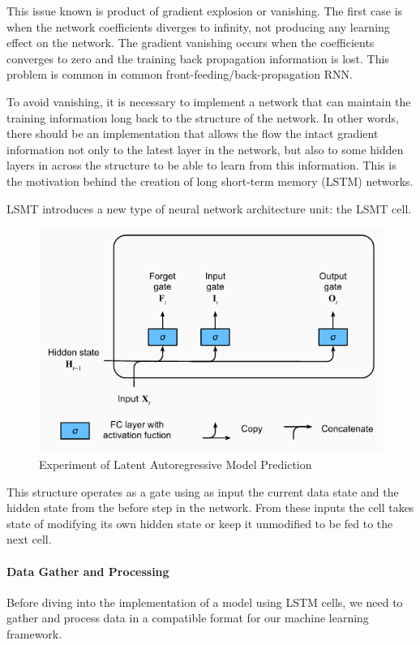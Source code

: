 This issue known is product of gradient explosion or vanishing. The first case is when
the network coefficients diverges to infinity, not producing any learning effect on the
network. The gradient vanishing occurs when the coefficients converges to zero and
the training back propagation information is lost. This problem is common in common
front-feeding/back-propagation RNN.

To avoid vanishing, it is necessary to implement a network that can maintain the
training information long back to the structure of the network. In other words, there
should be an implementation that allows the flow the intact gradient information not
only to the latest layer in the network, but also to some hidden layers in across the
structure to be able to learn from this information. This is the motivation behind the
creation of long short-term memory (LSTM) networks.

LSMT introduces a new type of neural network architecture unit: the LSMT cell.

\begin{figure}[h!]
  \includegraphics[width=\linewidth]{image/fig_JDF14.png}
  \caption{Experiment of Latent Autoregressive Model Prediction}
\end{figure}


This structure operates as a gate using as input the current data state and the hidden
state from the before step in the network. From these inputs the cell takes state of
modifying its own hidden state or keep it unmodified to be fed to the next cell.

\paragraph{Data Gather and Processing} Before diving into the implementation of a model
using LSTM cells, we need to gather and process data in a compatible format for our
machine learning framework.

